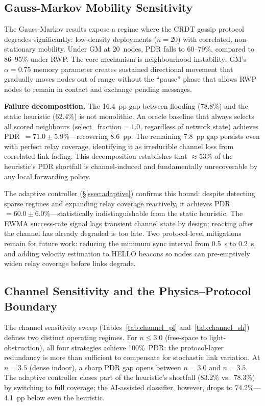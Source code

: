 \documentclass[conference]{IEEEtran}
\begin{document}
\subsection{Gauss-Markov Mobility Sensitivity}
\label{ssec:gm_discuss}

The Gauss-Markov results expose a regime where the CRDT gossip protocol
degrades significantly: low-density deployments ($n=20$) with correlated,
non-stationary mobility.  Under GM at 20~nodes, PDR falls to 60--79\%,
compared to 86--95\% under RWP.  The core mechanism is neighbourhood instability:
GM's $\alpha=0.75$ memory parameter creates sustained directional movement that
gradually moves nodes out of range without the ``pause'' phase that allows RWP
nodes to remain in contact and exchange pending messages.

\textbf{Failure decomposition.}  The 16.4~pp gap between flooding (78.8\%) and
the static heuristic (62.4\%) is not monolithic.  An oracle baseline that always
selects all scored neighbours (select\_fraction$=1.0$, regardless of network state)
achieves PDR~$=71.0\pm5.9$\%---recovering 8.6~pp.  The remaining 7.8~pp gap
persists even with perfect relay coverage, identifying it as irreducible channel
loss from correlated link fading.  This decomposition establishes that
$\approx$53\% of the heuristic's PDR shortfall is channel-induced and
fundamentally unrecoverable by any local forwarding policy.

The adaptive controller (§\ref{ssec:adaptive}) confirms this bound: despite
detecting sparse regimes and expanding relay coverage reactively, it achieves
PDR~$=60.0\pm6.0$\%---statistically indistinguishable from the static heuristic.
The EWMA success-rate signal lags transient channel state by design; reacting
after the channel has already degraded is too late.  Two protocol-level
mitigations remain for future work: reducing the minimum sync interval from
0.5~s to 0.2~s, and adding velocity estimation to HELLO beacons so nodes can
pre-emptively widen relay coverage before links degrade.

\subsection{Channel Sensitivity and the Physics--Protocol Boundary}
The channel sensitivity sweep (Tables~\ref{tab:channel_pl} and~\ref{tab:channel_sh})
defines two distinct operating regimes.  For $n \leq 3.0$ (free-space to
light-obstruction), all four strategies achieve 100\%~PDR: the
protocol-layer redundancy is more than sufficient to compensate for
stochastic link variation.  At $n=3.5$ (dense indoor), a sharp PDR gap
opens between $n=3.0$ and $n=3.5$.  The adaptive controller closes
part of the heuristic's shortfall (83.2\% vs.\ 78.3\%) by switching to
full coverage; the AI-assisted classifier, however, drops to 74.2\%---
4.1~pp below even the heuristic.
\end{document}
